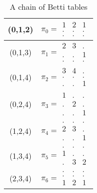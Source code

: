 \documentclass[12pt]{amsart}
\theoremstyle{plain}
\theoremstyle{definition}
\theoremstyle{remark}
\begin{document}
\begin{table}
\begin{tabular}{|c|c|}\hline
(0,1,2)&$\pi_0=\begin{array}{ccc}1&2&1\\.&.&.\\.&.&.\end{array}$\\\hline
(0,1,3)&$\pi_1=\begin{array}{ccc}2&3&.\\.&.&1\\.&.&.\end{array}$\\\hline
(0,1,4)&$\pi_2=\begin{array}{ccc}3&4&.\\.&.&.\\.&.&1\end{array}$\\\hline
(0,2,4)&$\pi_3=\begin{array}{ccc}1&.&.\\.&2&.\\.&.&1\end{array}$\\\hline
(1,2,4)&$\pi_4=\begin{array}{ccc}.&.&.\\2&3&.\\.&.&1\end{array}$\\\hline
(1,3,4)&$\pi_5=\begin{array}{ccc}.&.&.\\1&.&.\\.&3&2\end{array}$\\\hline
(2,3,4)&$\pi_6=\begin{array}{ccc}.&.&.\\.&.&.\\1&2&1\end{array}$\\\hline
\end{tabular}
\caption{A chain of Betti tables}\label{table:chain}
\end{table}
\end{document}
